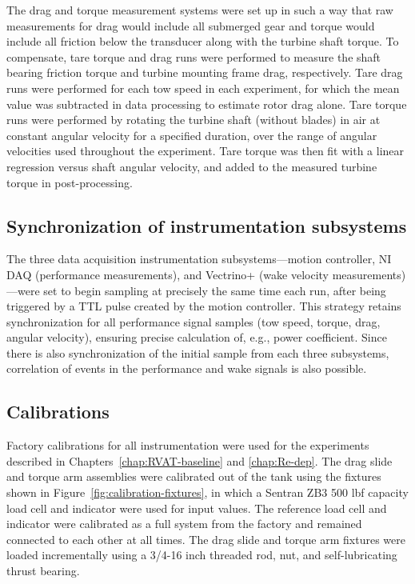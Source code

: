 The drag and torque measurement systems were set up in such a way that raw
measurements for drag would include all submerged gear and torque would include
all friction below the transducer along with the turbine shaft torque. To
compensate, tare torque and drag runs were performed to measure the shaft
bearing friction torque and turbine mounting frame drag, respectively. Tare drag
runs were performed for each tow speed in each experiment, for which the mean
value was subtracted in data processing to estimate rotor drag alone. Tare
torque runs were performed by rotating the turbine shaft (without blades) in air
at constant angular velocity for a specified duration, over the range of angular
velocities used throughout the experiment. Tare torque was then fit with a
linear regression versus shaft angular velocity, and added to the measured
turbine torque in post-processing.


\subsection{Synchronization of instrumentation subsystems}

The three data acquisition instrumentation subsystems---motion controller, NI
DAQ (performance measurements), and Vectrino+ (wake velocity
measurements)---were set to begin sampling at precisely the same time each run,
after being triggered by a TTL pulse created by the motion controller. This
strategy retains synchronization for all performance signal samples (tow speed,
torque, drag, angular velocity), ensuring precise calculation of, e.g., power
coefficient. Since there is also synchronization of the initial sample from each
three subsystems, correlation of events in the performance and wake signals is
also possible.



\subsection{Calibrations}

Factory calibrations for all instrumentation were used for the experiments
described in Chapters~\ref{chap:RVAT-baseline} and \ref{chap:Re-dep}. The drag
slide and torque arm assemblies were calibrated out of the tank using the
fixtures shown in Figure~\ref{fig:calibration-fixtures}, in which a Sentran ZB3
500 lbf capacity load cell and indicator were used for input values. The
reference load cell and indicator were calibrated as a full system from the
factory and remained connected to each other at all times. The drag slide and
torque arm fixtures were loaded incrementally using a 3/4-16 inch threaded rod,
nut, and self-lubricating thrust bearing.

